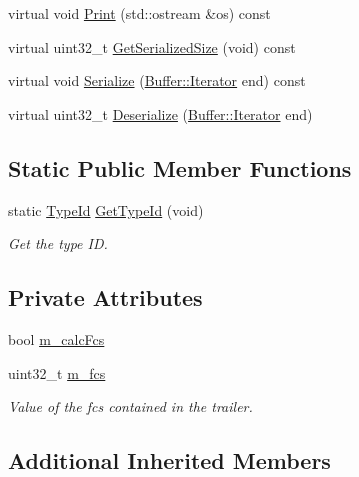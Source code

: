 \begin{DoxyCompactItemize}
virtual void \hyperlink{classns3_1_1EthernetTrailer_adaf4ea9a83b1883d455a1b7b1897566d}{Print} (std\+::ostream \&os) const 
\item 
virtual uint32\+\_\+t \hyperlink{classns3_1_1EthernetTrailer_ab4e890f7cf73069650d10ffdbbede2e8}{Get\+Serialized\+Size} (void) const 
\item 
virtual void \hyperlink{classns3_1_1EthernetTrailer_a0409af8e45e598fe3fd10406b43d1594}{Serialize} (\hyperlink{classns3_1_1Buffer_1_1Iterator}{Buffer\+::\+Iterator} end) const 
\item 
virtual uint32\+\_\+t \hyperlink{classns3_1_1EthernetTrailer_a5fae2c1d9c5dc8e4c60d6fae0df7404d}{Deserialize} (\hyperlink{classns3_1_1Buffer_1_1Iterator}{Buffer\+::\+Iterator} end)
\end{DoxyCompactItemize}
\subsection*{Static Public Member Functions}
\begin{DoxyCompactItemize}
\item 
static \hyperlink{classns3_1_1TypeId}{Type\+Id} \hyperlink{classns3_1_1EthernetTrailer_a302927809f737f47fc9dcc08f6f82a5b}{Get\+Type\+Id} (void)
\begin{DoxyCompactList}\small\item\em Get the type ID. \end{DoxyCompactList}\end{DoxyCompactItemize}
\subsection*{Private Attributes}
\begin{DoxyCompactItemize}
\item 
bool \hyperlink{classns3_1_1EthernetTrailer_a9ca507a0de944accf639cc345e46e838}{m\+\_\+calc\+Fcs}
\item 
uint32\+\_\+t \hyperlink{classns3_1_1EthernetTrailer_acc03b4e2e8a1778c79c4508ed20fe0c6}{m\+\_\+fcs}
\begin{DoxyCompactList}\small\item\em Value of the fcs contained in the trailer. \end{DoxyCompactList}\end{DoxyCompactItemize}
\subsection*{Additional Inherited Members}


